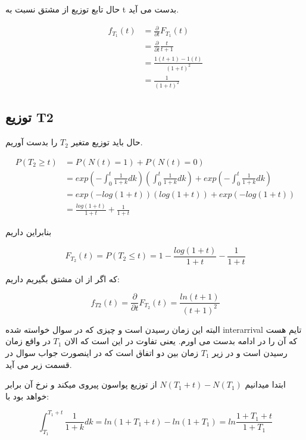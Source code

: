 \documentclass{article}[12pt]
\begin{document}
حال تابع توزیع از مشتق نسبت به t بدست می آید. 

\begin{equation}
\begin{split}
f_{T_1}(t) &=
\frac{\partial}{\partial t} F_{T_1}(t) \\ &=
\frac{\partial}{\partial t} \frac{t}{t+1} 
\\
&= 
\frac{1(t+1) - 1(t)}{(1+t)^2}
\\
&= \frac{1}{(1+t)^2}
\end{split}
\end{equation}


\subsection{توزیع T2}
حال باید توزیع متغیر 
$T_2$
را بدست آوریم. 

\begin{equation}
\begin{split}
P(T_2 \geq t) &= P(N(t) = 1) + P(N(t)=0)\\
&=
exp(-\int_0^t \frac{1}{1+k}dk) (\int_0^t \frac{1}{1+k}dk) +exp(-\int_0^t \frac{1}{1+k}dk)\\
&= 
exp(-log(1+t))(log(1+t)) +exp(-log(1+t))\\
&= 
\frac{log(1+t)}{1+t} + \frac{1}{1+t}
\end{split}
\end{equation}

بنابراین داریم

\begin{equation}
F_{T_2}(t) = P(T_2 \leq t) = 1- \frac{log(1+t)}{1+t} - \frac{1}{1+t} 
\end{equation}

که اگر از ان مشتق بگیریم داریم:

\begin{equation}
f_{T2}(t) = \frac{\partial}{\partial t} F_{T_2}(t) = \frac{ln(t+1)}{(t+1)^2}
\end{equation}

البته این زمان رسیدن است و چیزی که در سوال خواسته شده interarrival تایم هست که آن را در ادامه بدست می اورم. یعنی تفاوت در این است که الان 
$T_1$
در واقع 
زمان رسیدن است و 
در زیر 
$T_1$ 
زمان بین دو اتفاق است که در اینصورت جواب سوال در قسمت زیر می آید. 

ابتدا میدانیم  
$N(T_1+t) - N(T_1)$
از توزیع پواسون پیروی میکند و نرخ آن برابر خواهد بود با:

\begin{equation}
\int_{T_1}^{T_1+t} \frac{1}{1+k}dk = ln(1+T_1+t)-ln(1+T_1) = ln\frac{1+T_1+t}{1+T_1} 
\end{equation}
\end{document}
